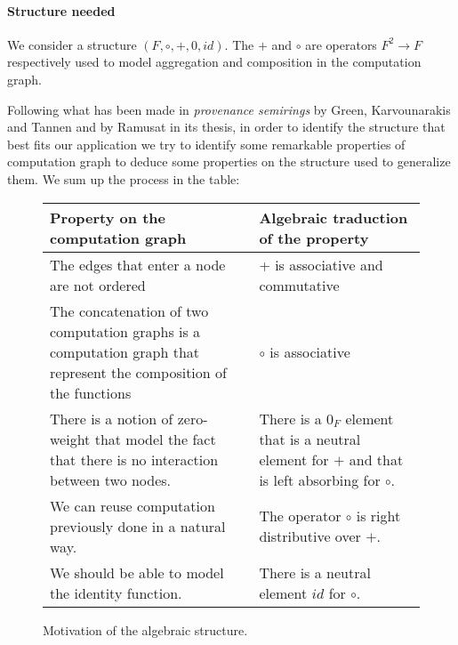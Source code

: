 \documentclass[11pt,a4paper]{article}
\theoremstyle{definition}
\begin{document}
	\paragraph{Structure needed} We consider a structure $(F,\circ,+,0,id)$. The $+$ and $\circ$ are operators $F^2 \to F$ respectively used to model aggregation and composition in the computation graph.

	Following what has been made in \textit{provenance semirings} by Green, Karvounarakis and Tannen and by Ramusat in its thesis, in order to identify the structure that best fits our application we try to identify some remarkable properties of computation graph to deduce some properties on the structure used to generalize them. We sum up the process in the table:

	\begin{figure}
		\centering
		\begin{tabular}{|C{7.5cm}|C{7.5cm}|}
			\hline 
			\textbf{Property on the computation graph} & \textbf{Algebraic traduction of the property} \\ 
			\hline 
			The edges that enter a node are not ordered & + is associative and commutative \\ 
			\hline
			The concatenation of two computation graphs is a computation graph that represent the composition of the functions & $\circ$ is associative \\ 
			\hline 
			There is a notion of zero-weight that model the fact that there is no interaction between two nodes. & There is a $0_F$ element that is a neutral element for $+$ and that is left absorbing for $\circ$. \\ 
			\hline 
			We can reuse computation previously done in a natural way. & The operator $\circ$ is right distributive over $+$. \\ 
			\hline 
			We should be able to model the identity function. & There is a neutral element $id$ for $\circ$. \\ 
			\hline 
		\end{tabular} 
	\caption{Motivation of the algebraic structure.}
	\label{fig:table_algebraic_structure}
	\end{figure}
\end{document}
